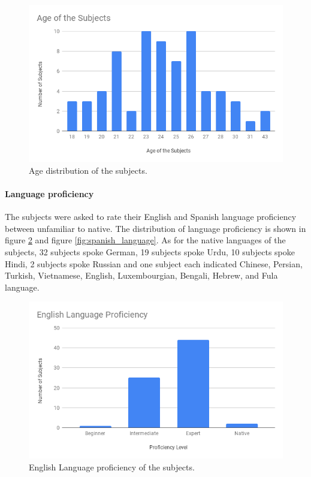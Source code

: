 \begin{figure}
    \centering
    \includegraphics[width=140mm]{Figures/age_of_subjects.png}
    \caption{Age distribution of the subjects.}
    \label{fig:age_distribution}
\end{figure}

\paragraph{Language proficiency} The subjects were asked to rate their English and Spanish language proficiency between unfamiliar to native. The distribution of language proficiency is shown in figure \ref{fig:english_language} and figure \ref{fig:spanish_language}. As for the native languages of the subjects, 32 subjects spoke German, 19 subjects spoke Urdu, 10 subjects spoke Hindi, 2 subjects spoke Russian and one subject each indicated Chinese, Persian, Turkish, Vietnamese, English, Luxembourgian, Bengali, Hebrew, and Fula language.

\begin{figure}
    \centering
    \includegraphics[width=140mm]{Figures/english_language_proficiency.png}
    \caption{English Language proficiency of the subjects.}
    \label{fig:english_language}
\end{figure}

